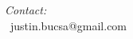 \documentclass[9pt,a4paper,twoside]{tau}
\begin{document}
       

					

\printbibliography


\begin{center}
	
	\vskip10pt
	\textit{Contact:} \\
	\faEnvelope[regular]\ justin.bucsa@gmail.com \\

\end{center}

\end{document}
